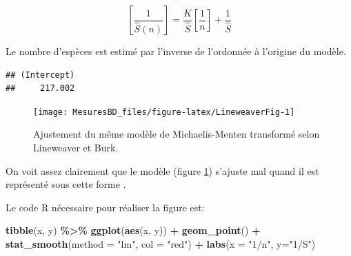 \documentclass[
  11pt,
  american,
  a4paper,
  extrafontsizes,onecolumn,openright
  ]{memoir}
\newenvironment{Shaded}{\begin{snugshade}}{\end{snugshade}}
\newcommand{\AttributeTok}[1]{\textcolor[rgb]{0.13,0.29,0.53}{#1}}
\newcommand{\DecValTok}[1]{\textcolor[rgb]{0.00,0.00,0.81}{#1}}
\newcommand{\FunctionTok}[1]{\textcolor[rgb]{0.13,0.29,0.53}{\textbf{#1}}}
\newcommand{\NormalTok}[1]{#1}
\newcommand{\OtherTok}[1]{\textcolor[rgb]{0.56,0.35,0.01}{#1}}
\newcommand{\SpecialCharTok}[1]{\textcolor[rgb]{0.81,0.36,0.00}{\textbf{#1}}}
\newcommand{\StringTok}[1]{\textcolor[rgb]{0.31,0.60,0.02}{#1}}
\begin{document}
\begin{equation}
  \label{eq:Lineweaver1934}
  \left [\frac{1}{\hat{S}(n)} \right] 
  = \frac{K}{\hat{S}} \left[ \frac{1}{n} \right] + \frac{1}{\hat{S}} 
\end{equation}

Le nombre d'espèces est estimé par l'inverse de l'ordonnée à l'origine du modèle.

\scriptsize

\begin{Shaded}
\end{Shaded}

\begin{verbatim}
## (Intercept) 
##     217.002
\end{verbatim}

\normalsize



\scriptsize

\begin{figure}

{\centering \texttt{[image: MesuresBD\_files/figure-latex/LineweaverFig-1]} 

}

\caption{Ajustement du même modèle de Michaelis-Menten transformé selon Lineweaver et Burk.}\label{fig:LineweaverFig}
\end{figure}

\normalsize

On voit assez clairement que le modèle (figure \ref{fig:LineweaverFig}) s'ajuste mal quand il est représenté sous cette forme \autocite{Raaijmakers1987}.

Le code R nécessaire pour réaliser la figure est:

\scriptsize

\begin{Shaded}
\begin{Highlighting}[]
\FunctionTok{tibble}\NormalTok{(x, y) }\SpecialCharTok{\%\textgreater{}\%} 
  \FunctionTok{ggplot}\NormalTok{(}\FunctionTok{aes}\NormalTok{(x, y)) }\SpecialCharTok{+} 
    \FunctionTok{geom\_point}\NormalTok{() }\SpecialCharTok{+}
    \FunctionTok{stat\_smooth}\NormalTok{(}\AttributeTok{method =} \StringTok{"lm"}\NormalTok{, }\AttributeTok{col =} \StringTok{"red"}\NormalTok{) }\SpecialCharTok{+}
    \FunctionTok{labs}\NormalTok{(}\AttributeTok{x =} \StringTok{"1/n"}\NormalTok{, }\AttributeTok{y=}\StringTok{"1/S"}\NormalTok{)}
\end{Highlighting}
\end{Shaded}
\end{document}
